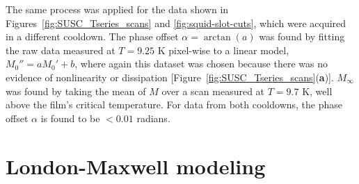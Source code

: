 \documentclass[%
 reprint,
 superscriptaddress,
 amsmath,
 amssymb,
 amsfonts,
 aps,
 prb,
]{revtex4-2}
\begin{document}
The same process was applied for the data shown in Figures~\ref{fig:SUSC_Tseries_scans} and \ref{fig:squid-slot-cuts}, which were acquired in a different cooldown. The phase offset $\alpha=\arctan(a)$ was found by fitting the raw data measured at $T=9.25$ K pixel-wise to a linear model, $M_0''=aM_0' + b$, where again this dataset was chosen because there was no evidence of nonlinearity or dissipation [Figure~\ref{fig:SUSC_Tseries_scans}({\bf a})]. $M_\infty$ was found by taking the mean of $M$ over a scan measured at $T=9.7$ K, well above the film's critical temperature. For data from both cooldowns, the phase offset $\alpha$ is found to be $<0.01$ radians.

\section{London-Maxwell modeling}
\label{sec:london-maxwell}
\end{document}

